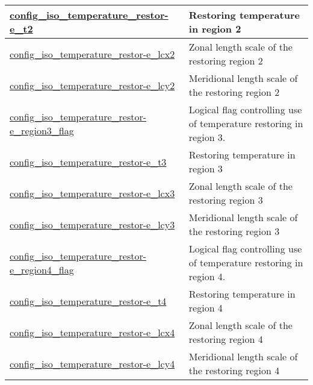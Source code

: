 {\begin{center}
\begin{longtable}{| p{2.0in} || p{4.0in} |}
    \hline
    \hyperref[subsec:nm_sec_config_iso_temperature_restore_t2]{config\_iso\_temperature\_restor-}\hyperref[subsec:nm_sec_config_iso_temperature_restore_t2]{e\_t2}& Restoring temperature in region 2 \\
    \hline
    \hyperref[subsec:nm_sec_config_iso_temperature_restore_lcx2]{config\_iso\_temperature\_restor-}\hyperref[subsec:nm_sec_config_iso_temperature_restore_lcx2]{e\_lcx2}& Zonal length scale of the restoring region 2 \\
    \hline
    \hyperref[subsec:nm_sec_config_iso_temperature_restore_lcy2]{config\_iso\_temperature\_restor-}\hyperref[subsec:nm_sec_config_iso_temperature_restore_lcy2]{e\_lcy2}& Meridional length scale of the restoring region 2 \\
    \hline
    \hyperref[subsec:nm_sec_config_iso_temperature_restore_region3_flag]{config\_iso\_temperature\_restor-}\hyperref[subsec:nm_sec_config_iso_temperature_restore_region3_flag]{e\_region3\_flag}& Logical flag controlling use of temperature restoring in region 3. \\
    \hline
    \hyperref[subsec:nm_sec_config_iso_temperature_restore_t3]{config\_iso\_temperature\_restor-}\hyperref[subsec:nm_sec_config_iso_temperature_restore_t3]{e\_t3}& Restoring temperature in region 3 \\
    \hline
    \hyperref[subsec:nm_sec_config_iso_temperature_restore_lcx3]{config\_iso\_temperature\_restor-}\hyperref[subsec:nm_sec_config_iso_temperature_restore_lcx3]{e\_lcx3}& Zonal length scale of the restoring region 3 \\
    \hline
    \hyperref[subsec:nm_sec_config_iso_temperature_restore_lcy3]{config\_iso\_temperature\_restor-}\hyperref[subsec:nm_sec_config_iso_temperature_restore_lcy3]{e\_lcy3}& Meridional length scale of the restoring region 3 \\
    \hline
    \hyperref[subsec:nm_sec_config_iso_temperature_restore_region4_flag]{config\_iso\_temperature\_restor-}\hyperref[subsec:nm_sec_config_iso_temperature_restore_region4_flag]{e\_region4\_flag}& Logical flag controlling use of temperature restoring in region 4. \\
    \hline
    \hyperref[subsec:nm_sec_config_iso_temperature_restore_t4]{config\_iso\_temperature\_restor-}\hyperref[subsec:nm_sec_config_iso_temperature_restore_t4]{e\_t4}& Restoring temperature in region 4 \\
    \hline
    \hyperref[subsec:nm_sec_config_iso_temperature_restore_lcx4]{config\_iso\_temperature\_restor-}\hyperref[subsec:nm_sec_config_iso_temperature_restore_lcx4]{e\_lcx4}& Zonal length scale of the restoring region 4 \\
    \hline
    \hyperref[subsec:nm_sec_config_iso_temperature_restore_lcy4]{config\_iso\_temperature\_restor-}\hyperref[subsec:nm_sec_config_iso_temperature_restore_lcy4]{e\_lcy4}& Meridional length scale of the restoring region 4 \\
    \hline
\end{longtable}
\end{center}
}
